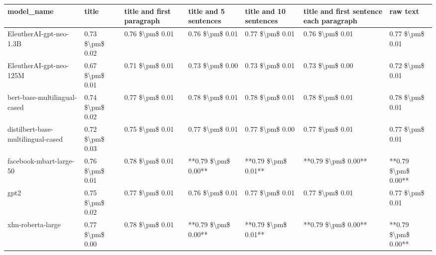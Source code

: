 \begin{tabular}{lllllll}
\toprule
                        model\_name &           title & title and first paragraph & title and 5 sentences & title and 10 sentences & title and first sentence each paragraph &            raw text \\
\midrule
           EleutherAI-gpt-neo-1.3B & 0.73 \$\textbackslash pm\$ 0.02 &           0.76 \$\textbackslash pm\$ 0.01 &       0.76 \$\textbackslash pm\$ 0.01 &        0.77 \$\textbackslash pm\$ 0.01 &                         0.76 \$\textbackslash pm\$ 0.01 &     0.77 \$\textbackslash pm\$ 0.01 \\
           EleutherAI-gpt-neo-125M & 0.67 \$\textbackslash pm\$ 0.01 &           0.71 \$\textbackslash pm\$ 0.01 &       0.73 \$\textbackslash pm\$ 0.00 &        0.73 \$\textbackslash pm\$ 0.01 &                         0.73 \$\textbackslash pm\$ 0.00 &     0.72 \$\textbackslash pm\$ 0.01 \\
      bert-base-multilingual-cased & 0.74 \$\textbackslash pm\$ 0.02 &           0.77 \$\textbackslash pm\$ 0.01 &       0.78 \$\textbackslash pm\$ 0.01 &        0.78 \$\textbackslash pm\$ 0.01 &                         0.78 \$\textbackslash pm\$ 0.01 &     0.78 \$\textbackslash pm\$ 0.01 \\
distilbert-base-multilingual-cased & 0.72 \$\textbackslash pm\$ 0.03 &           0.75 \$\textbackslash pm\$ 0.01 &       0.77 \$\textbackslash pm\$ 0.01 &        0.77 \$\textbackslash pm\$ 0.00 &                         0.77 \$\textbackslash pm\$ 0.01 &     0.77 \$\textbackslash pm\$ 0.01 \\
           facebook-mbart-large-50 & 0.76 \$\textbackslash pm\$ 0.01 &           0.78 \$\textbackslash pm\$ 0.01 &   **0.79 \$\textbackslash pm\$ 0.00** &    **0.79 \$\textbackslash pm\$ 0.01** &                     **0.79 \$\textbackslash pm\$ 0.00** & **0.79 \$\textbackslash pm\$ 0.00** \\
                              gpt2 & 0.75 \$\textbackslash pm\$ 0.02 &           0.77 \$\textbackslash pm\$ 0.01 &       0.76 \$\textbackslash pm\$ 0.01 &        0.77 \$\textbackslash pm\$ 0.01 &                         0.77 \$\textbackslash pm\$ 0.01 &     0.77 \$\textbackslash pm\$ 0.01 \\
                 xlm-roberta-large & 0.77 \$\textbackslash pm\$ 0.00 &           0.78 \$\textbackslash pm\$ 0.01 &   **0.79 \$\textbackslash pm\$ 0.00** &    **0.79 \$\textbackslash pm\$ 0.01** &                     **0.79 \$\textbackslash pm\$ 0.00** & **0.79 \$\textbackslash pm\$ 0.00** \\
\bottomrule
\end{tabular}
